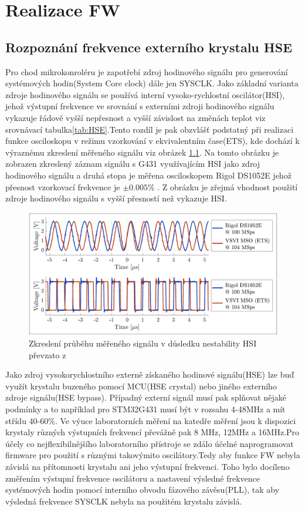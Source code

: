 
\chapter{Realizace FW}
\section{Rozpoznání frekvence externího krystalu HSE}
Pro chod mikrokonroléru je zapotřebí zdroj hodinového signálu pro generování systémových hodin(System Core clock) dále jen SYSCLK. Jako základní varianta zdroje hodinového signálu se používá interní vysoko-rychlostní oscilátor(HSI), jehož výstupní frekvence ve srovnání s externími zdroji hodinového signálu vykazuje řádově vyšší nepřesnost a vyšší závislost na změnách teplot viz srovnávací tabulka\ref{tab:HSE}.Tento rozdíl je pak obzvlášť podstatný při realizaci funkce osciloskopu v režimu vzorkování v ekvivalentním čase(ETS), kde dochází k výraznému zkreslení měřeného signálu viz obrázek \ref{fig:signaldistortionhsi}. Na tomto obrázku je zobrazen zkreslený záznam signálu s G431 využívajícím HSI jako zdroj hodinového signálu a druhá stopa je měřena osciloskopem Rigol DS1052E jehož přesnost vzorkovací frekvence je $\pm0.005\%$ \cite{ScopeRigol}. Z obrázku je zřejmá vhodnost použití zdroje hodinového signálu s vyšší přesností než vykazuje HSI.

\begin{figure}[H]
	\centering
	\includegraphics[width=0.7\linewidth]{Figs/Graphs/SignalDistortion_HSI}
	\caption{Zkreslení průběhu měřeného signálu v důsledku nestability HSI převzato z \cite{DujavaDIP}}
	\label{fig:signaldistortionhsi}
\end{figure}

Jako zdroj vysokorychlostního externě získaného hodinové signálu(HSE) lze buď využít krystalu buzeného pomocí MCU(HSE crystal) nebo jiného externího zdroje signálu(HSE bypass). Případný externí signál musí pak splňovat nějaké podmínky a to například pro STM32G431 musí být v rozsahu 4-48MHz a mít střídu 40-60\%. Ve výuce laboratorních měření na katedře měření jsou k dispozici krystaly různých výstupních frekvencí převážně pak 8 MHz, 12MHz a 16MHz.Pro  účely co nejflexibilnějšího laboratorního přístroje se zdálo účelné naprogramovat firmware pro použití s různými takovýmito oscilátory.Tedy aby funkce FW nebyla závislá na přítomnosti krystalu ani jeho výstupní frekvenci. Toho bylo docíleno změřením výstupní frekvence oscilátoru a nastavení výsledné frekvence systémových hodin pomocí interního obvodu fázového závěsu(PLL), tak aby výsledná frekvence SYSCLK nebyla na použitém krystalu závislá.

